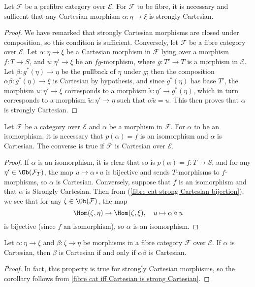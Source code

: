 \begin{proposition}\label{fibre cat iff Cartesian is strong Cartesian}
Let $\mathcal{F}$ be a prefibre category over $\mathcal{E}$. For $\mathcal{F}$ to be fibre, it is necessary and sufficent that any Cartesian morphism $\alpha:\eta\to \xi$ is strongly Cartesian.
\end{proposition}
\begin{proof}
We have remarked that strongly Cartesian morphisms are closed under composition, so this condition is sufficient. Conversely, let $\mathcal{F}$ be a fibre category over $\mathcal{E}$. Let $\alpha:\eta\to \xi$ be a Cartesian morphism in $\mathcal{F}$ lying over a morphism $f:T\to S$, and $u:\eta'\to \xi$ be an $fg$-morphism, where $g:T'\to T$ is a morphism in $\mathcal{E}$. Let $\beta:g^*(\eta)\to \eta$ be the pullback of $\eta$ under $g$; then the composition $\alpha\beta:g^*(\eta)\to \xi$ is Cartesian by hypothesis, and since $g^*(\eta)$ has base $T'$, the morphism $u:\eta'\to \xi$ corresponds to a morphism $\tilde{v}:\eta'\to g^*(\eta)$, which in turn corresponds to a morphism $\tilde{u}:\eta'\to \eta$ such that $\alpha\tilde{u}=u$. This then proves that $\alpha$ is strongly Cartesian.
\end{proof}
\begin{corollary}\label{fibre cat isomorphism iff image isomorphism and Cartesian}
Let $\mathcal{F}$ be a category over $\mathcal{E}$ and $\alpha$ be a morphism in $\mathcal{F}$. For $\alpha$ to be an isomorphism, it is necessary that $p(\alpha)=f$ is an isomorphism and $\alpha$ is Cartesian. The converse is true if $\mathcal{F}$ is Cartesian over $\mathcal{E}$.
\end{corollary}
\begin{proof}
If $\alpha$ is an isomorphism, it is clear that so is $p(\alpha)=f:T\to S$, and for any $\eta'\in\Ob(\mathcal{F}_T)$, the map $u\mapsto\alpha\circ u$ is bijective and sends $T$-morphisms to $f$-morphisms, so $\alpha$ is Cartesian. Conversely, suppose that $f$ is an isomorphism and that $\alpha$ is Strongly Cartesian. Then from (\ref{fibre cat strong Cartesian bijection}), we see that for any $\zeta\in\Ob(\mathcal{F})$, the map
\[\Hom(\zeta,\eta)\to \Hom(\zeta,\xi),\quad u\mapsto\alpha\circ u\]
is bijective (since $f$ an isomorphism), so $\alpha$ is an isomorphism.
\end{proof}
\begin{corollary}\label{fibre cat Cartesian iff Cartesian composition}
Let $\alpha:\eta\to \xi$ and $\beta:\zeta\to \eta$ be morphisms in a fibre category $\mathcal{F}$ over $\mathcal{E}$. If $\alpha$ is Cartesian, then $\beta$ is Cartesian if and only if $\alpha\beta$ is Cartesian.
\end{corollary}
\begin{proof}
In fact, this property is true for strongly Cartesian morphisms, so the corollary follows from \cref{fibre cat iff Cartesian is strong Cartesian}. 
\end{proof}
